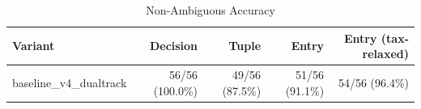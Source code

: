 \begin{table}[htbp]
\centering
\caption{Non-Ambiguous Accuracy}
\label{tab:acc-non-ambig}
\begin{tabular}{l rrrr}
\toprule
Variant & Decision & Tuple & Entry & Entry (tax-relaxed) \\
\midrule
  baseline\_v4\_dualtrack & 56/56 (100.0\%) & 49/56 (87.5\%) & 51/56 (91.1\%) & 54/56 (96.4\%) \\
\bottomrule
\end{tabular}
\end{table}
